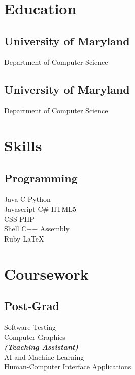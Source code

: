 \documentclass[a4paper]{deedy-resume-openfont} %
\begin{document}
\begin{minipage}[t]{0.34\textwidth} 

\section{Education} 
\subsection{University of Maryland}
Department of Computer Science \\
\sectionsep

\subsection{University of Maryland}
Department of Computer Science \\
\sectionsep



\section{Skills}
\subsection{Programming}
Java \textbullet{}   C \textbullet{} Python \\
Javascript \textbullet{} C\# \textbullet{} HTML5 \\
CSS \textbullet{} PHP \\
Shell \textbullet{} C++ \textbullet{} Assembly \\ 
Ruby \textbullet{} \LaTeX\
\sectionsep


\section{Coursework}
\subsection{Post-Grad}
Software Testing \\
Computer Graphics \\
{\footnotesize \textit{\textbf{(Teaching Assistant) }}} \\
AI and Machine Learning \\
Human-Computer Interface Applications \\
\sectionsep


\end{minipage}
\end{document}
